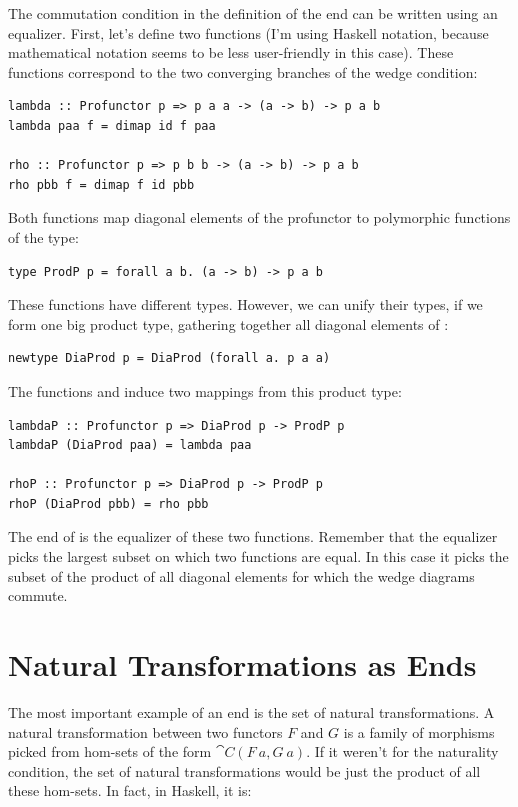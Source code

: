 The commutation condition in the definition of the end can be written
using an equalizer. First, let's define two functions (I'm using Haskell
notation, because mathematical notation seems to be less user-friendly
in this case). These functions correspond to the two converging branches
of the wedge condition:

\begin{Verbatim}
lambda :: Profunctor p => p a a -> (a -> b) -> p a b
lambda paa f = dimap id f paa

rho :: Profunctor p => p b b -> (a -> b) -> p a b
rho pbb f = dimap f id pbb
\end{Verbatim}
Both functions map diagonal elements of the profunctor  to
polymorphic functions of the type:

\begin{Verbatim}
type ProdP p = forall a b. (a -> b) -> p a b
\end{Verbatim}
These functions have different types. However, we can unify their types,
if we form one big product type, gathering together all diagonal
elements of :

\begin{Verbatim}
newtype DiaProd p = DiaProd (forall a. p a a)
\end{Verbatim}
The functions  and  induce two mappings from
this product type:

\begin{Verbatim}
lambdaP :: Profunctor p => DiaProd p -> ProdP p
lambdaP (DiaProd paa) = lambda paa

rhoP :: Profunctor p => DiaProd p -> ProdP p
rhoP (DiaProd pbb) = rho pbb
\end{Verbatim}
The end of  is the equalizer of these two functions. Remember
that the equalizer picks the largest subset on which two functions are
equal. In this case it picks the subset of the product of all diagonal
elements for which the wedge diagrams commute.

\section{Natural Transformations as Ends}

The most important example of an end is the set of natural
transformations. A natural transformation between two functors
$F$ and $G$ is a family of morphisms picked from hom-sets
of the form $\cat{C}(F\ a, G\ a)$. If it weren't for the naturality
condition, the set of natural transformations would be just the product
of all these hom-sets. In fact, in Haskell, it is:

